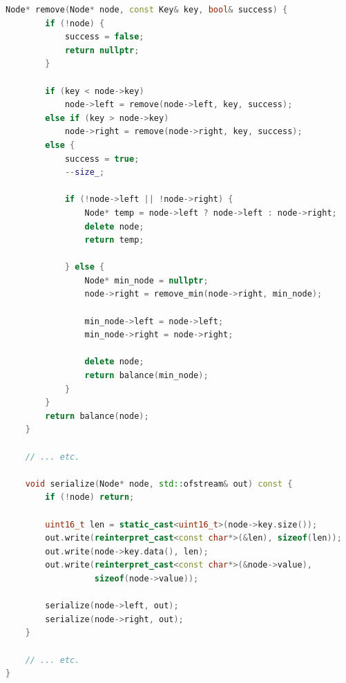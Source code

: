\begin{lstlisting}[language=C++]
    Node* remove(Node* node, const Key& key, bool& success) {
        if (!node) {
            success = false;
            return nullptr;
        }

        if (key < node->key)
            node->left = remove(node->left, key, success);
        else if (key > node->key)
            node->right = remove(node->right, key, success);
        else {
            success = true;
            --size_;

            if (!node->left || !node->right) {
                Node* temp = node->left ? node->left : node->right;
                delete node;
                return temp;

            } else {
                Node* min_node = nullptr;
                node->right = remove_min(node->right, min_node);

                min_node->left = node->left;
                min_node->right = node->right;

                delete node;
                return balance(min_node);
            }
        }
        return balance(node);
    }

    // ... etc.

    void serialize(Node* node, std::ofstream& out) const {
        if (!node) return;

        uint16_t len = static_cast<uint16_t>(node->key.size());
        out.write(reinterpret_cast<const char*>(&len), sizeof(len));
        out.write(node->key.data(), len);
        out.write(reinterpret_cast<const char*>(&node->value),
                  sizeof(node->value));

        serialize(node->left, out);
        serialize(node->right, out);
    }

    // ... etc.
}
\end{lstlisting}
\pagebreak